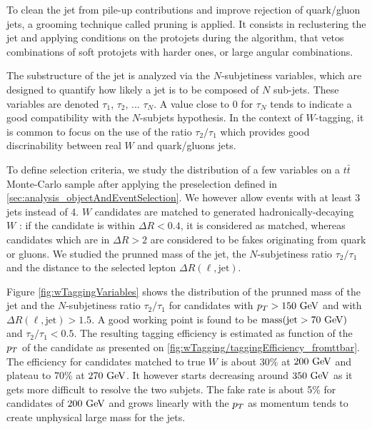             To clean the jet from pile-up contributions and improve rejection of 
            quark/gluon jets, a grooming technique called pruning is applied. It 
            consists in reclustering the jet and applying 
            conditions on the protojets during the algorithm, that vetos combinations of
            soft protojets with harder ones, or large angular combinations. 
           
            The substructure of the jet is analyzed via the $N$-subjetiness variables,
            which are designed to quantify how likely a jet is to be composed of $N$
            sub-jets.  These variables are denoted $\tau_1$,
            $\tau_2$, ... $\tau_N$. A value close to 0 for $\tau_N$ tends to indicate
            a good compatibility with the $N$-subjets hypothesis. In the context of 
            $W$-tagging, it is common to focus on the use of the ratio $\tau_2/\tau_1$ 
            which provides good discrinability between real $W$ and quark/gluons jets.

            To define selection criteria, we study the distribution of a few variables
            on a $t\bar{t}$ Monte-Carlo sample after applying the preselection defined in 
            \ref{sec:analysis_objectAndEventSelection}. We however allow events with at 
            least 3 jets instead of 4. $W$ candidates are matched to generated 
            hadronically-decaying $W$ : if the candidate is within $\Delta R < 0.4$, it
            is considered as matched, whereas candidates which are in $\Delta R > 2$ are
            considered to be fakes originating from quark or gluons. We studied the 
            prunned mass of the jet, the $N$-subjetiness ratio $\tau_2 / \tau_1$ and the 
            distance to the selected lepton $\Delta R (\ell,\text{jet})$.

            Figure \ref{fig:wTaggingVariables} shows the distribution of the prunned mass of
            the jet and the $N$-subjetiness ratio $\tau_2 / \tau_1$ for candidates with
            $p_T > 150~\text{GeV}$ and with $\Delta R(\ell,\text{jet}) > 1.5$. A good working point
            is found to be $\text{mass}(\text{jet} > 70~\text{GeV})$ and $\tau_2 / \tau_1 < 0.5$.
            The resulting tagging efficiency is estimated as function of the $p_T$ of the
            candidate as presented on \ref{fig:wTagging/taggingEfficiency_fromttbar}. 
            The efficiency for candidates matched
            to true $W$ is about 30\% at $200~\text{GeV}$ and plateau to 70\% at $270~\text{GeV}$. It
            however starts decreasing around $350~\text{GeV}$ as it gets more difficult to resolve
            the two subjets. The fake rate is about 5\% for candidates of $200~\text{GeV}$ and
            grows linearly with the $p_T$ as momentum tends to create unphysical large
            mass for the jets.

